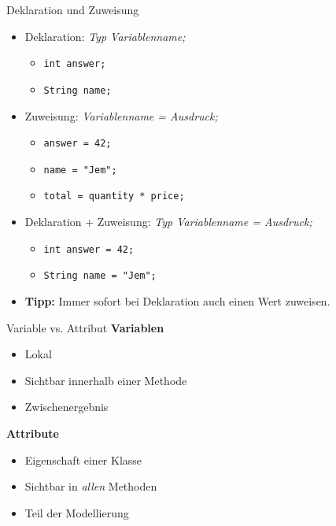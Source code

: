 \documentclass[18pt]{beamer}
\begin{document}
\begin{frame}{Deklaration und Zuweisung}
    \begin{itemize}
        \item Deklaration: \textit{Typ Variablenname;}
        \begin{itemize}
            \item \texttt{int answer;}
            \item \texttt{String name;}
        \end{itemize}
        \pause
        \item Zuweisung: \textit{Variablenname = Ausdruck;}
        \begin{itemize}
            \item \texttt{answer = 42;}
            \item \texttt{name = "Jem";}
            \item \texttt{total = quantity * price;}
        \end{itemize}
        \pause
        \item Deklaration + Zuweisung: \textit{Typ Variablenname = Ausdruck;}
        \begin{itemize}
            \item \texttt{int answer = 42;}
            \item \texttt{String name = "Jem";}
        \end{itemize}
        \pause
        \vspace{.1in}
        \item \textbf{Tipp:} Immer sofort bei Deklaration auch einen Wert zuweisen.
    \end{itemize}
\end{frame}

\begin{frame}{Variable vs. Attribut}
    \textbf{Variablen}
    \pause
    \begin{itemize}
        \item Lokal
        \item Sichtbar innerhalb einer Methode
        \item Zwischenergebnis
    \end{itemize}
    \pause
    \textbf{Attribute}
    \pause
    \begin{itemize}
        \item Eigenschaft einer Klasse
        \item Sichtbar in \textit{allen} Methoden
        \item Teil der Modellierung
    \end{itemize}
\end{frame}
\end{document}
